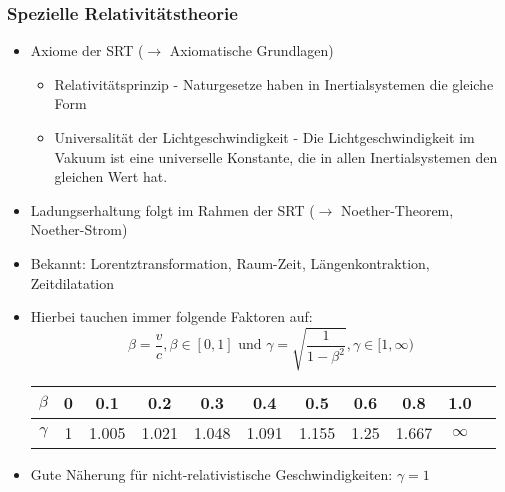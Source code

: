 \begin{frame}
  \frametitle{Spezielle Relativitätstheorie}
  \begin{itemize}[<+->]
  \item Axiome der SRT ($\to$ Axiomatische Grundlagen)
      \begin{itemize}[<+->]
      \item \alert{Relativitätsprinzip} - Naturgesetze haben in Inertialsystemen die gleiche Form
        \item \alert{Universalität der Lichtgeschwindigkeit} - Die Lichtgeschwindigkeit im Vakuum ist eine universelle Konstante, die in allen Inertialsystemen den gleichen Wert hat. 
        \end{itemize}
      \item Ladungserhaltung folgt im Rahmen der SRT ($\to$ Noether-Theorem, Noether-Strom)
      \item Bekannt: \alert{Lorentztransformation}, \alert{Raum-Zeit}, \alert{Längenkontraktion}, \alert{Zeitdilatation}
      \item Hierbei tauchen immer folgende Faktoren auf:
        $$
        \beta = \frac{v}{c}, \beta \in [0, 1] \text{ und } \gamma = \sqrt{\frac{1}{1-\beta^2}}, \gamma \in [1,\infty) 
        $$
        \begin{tabular}{c||c|c|c|c|c|c |c|c|c|c}
          $\beta$ & 0 & 0.1 & 0.2 & 0.3 & 0.4 & 0.5 & 0.6  & 0.8  & 1.0\\
          \hline
     $\gamma$ & 1 & 1.005 & 1.021 & 1.048 & 1.091 &  1.155 &  1.25 & 1.667  & $\infty$
        \end{tabular}
        \item Gute Näherung für nicht-relativistische Geschwindigkeiten: \alert{$\gamma = 1$}
\end{itemize}
\end{frame}

